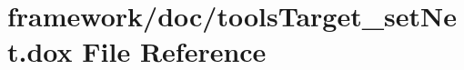 \hypertarget{tools_target__set_net_8dox}{}\section{framework/doc/tools\+Target\+\_\+set\+Net.dox File Reference}
\label{tools_target__set_net_8dox}
